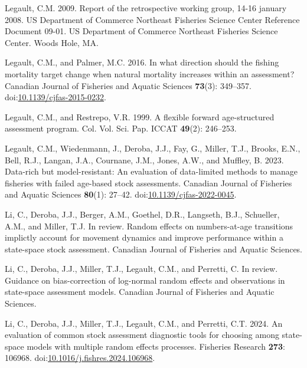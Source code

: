 \documentclass[
  12pt,
]{article}
\newlength{\cslhangindent}
\newenvironment{CSLReferences}[2] %
 {\begin{list}{}{%
  \setlength{\itemindent}{0pt}
  \setlength{\leftmargin}{0pt}
  \setlength{\parsep}{0pt}
  \ifodd #1
   \setlength{\leftmargin}{\cslhangindent}
   \setlength{\itemindent}{-1\cslhangindent}
  \fi
  \setlength{\itemsep}{#2\baselineskip}}}
 {\end{list}}
\begin{document}
\begin{CSLReferences}{1}{0}
Legault, C.M. 2009. Report of the retrospective working group, 14-16
january 2008. US Department of Commerce Northeast Fisheries Science
Center Reference Document 09-01. US Department of Commerce Northeast
Fisheries Science Center. Woods Hole, MA.

Legault, C.M., and Palmer, M.C. 2016. In what direction should the
fishing mortality target change when natural mortality increases within
an assessment? Canadian Journal of Fisheries and Aquatic Sciences
\textbf{73}(3): 349--357.
doi:\href{https://doi.org/10.1139/cjfas-2015-0232}{10.1139/cjfas-2015-0232}.

Legault, C.M., and Restrepo, V.R. 1999. A flexible forward
age-structured assessment program. Col. Vol. Sci. Pap. ICCAT
\textbf{49}(2): 246--253.

Legault, C.M., Wiedenmann, J., Deroba, J.J., Fay, G., Miller, T.J.,
Brooks, E.N., Bell, R.J., Langan, J.A., Cournane, J.M., Jones, A.W., and
Muffley, B. 2023. Data-rich but model-resistant: An evaluation of
data-limited methods to manage fisheries with failed age-based stock
assessments. Canadian Journal of Fisheries and Aquatic Sciences
\textbf{80}(1): 27--42.
doi:\href{https://doi.org/10.1139/cjfas-2022-0045}{10.1139/cjfas-2022-0045}.

Li, C., Deroba, J.J., Berger, A.M., Goethel, D.R., Langseth, B.J.,
Schueller, A.M., and Miller, T.J. In review. Random effects on
numbers-at-age transitions implictly account for movement dynamics and
improve performance within a state-space stock assessment. Canadian
Journal of Fisheries and Aquatic Sciences.

Li, C., Deroba, J.J., Miller, T.J., Legault, C.M., and Perretti, C. In
review. Guidance on bias-correction of log-normal random effects and
observations in state-space assessment models. Canadian Journal of
Fisheries and Aquatic Sciences.

Li, C., Deroba, J.J., Miller, T.J., Legault, C.M., and Perretti, C.T.
2024. An evaluation of common stock assessment diagnostic tools for
choosing among state-space models with multiple random effects
processes. Fisheries Research \textbf{273}: 106968.
doi:\href{https://doi.org/10.1016/j.fishres.2024.106968}{10.1016/j.fishres.2024.106968}.


\end{CSLReferences}
\end{document}
